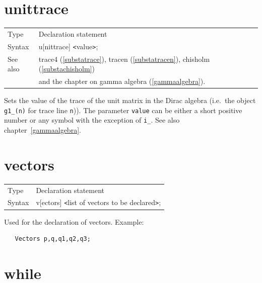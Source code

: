 
\section{unittrace}
\label{substaunittrace}

\noindent \begin{tabular}{ll}
Type & Declaration statement\\
Syntax & u[nittrace] {\tt<}value{\tt>}; \\
See also & trace4 (\ref{substatrace}), tracen (\ref{substatracen}),
    chisholm (\ref{substachisholm}) \\ &
    and the chapter on gamma algebra (\ref{gammaalgebra}).
\end{tabular} \vspace{4mm}

\noindent Sets the value of the trace of the 
unit matrix in the Dirac 
algebra (i.e.\ the object \verb:g1_(n): for trace line 
\verb:n:)). The parameter \verb:value: can be either a short positive 
number or any symbol with the exception of \verb:i_:. See also 
chapter~\ref{gammaalgebra}. \vspace{10mm}


\section{vectors}
\label{substavectors}

\noindent \begin{tabular}{ll}
Type & Declaration statement\\
Syntax & v[ectors] {\tt<}list of vectors to be declared{\tt>};
\end{tabular} \vspace{4mm}

\noindent Used for the declaration of vectors. Example:
\begin{verbatim}
   Vectors p,q,q1,q2,q3;
\end{verbatim}
\vspace{10mm}


\section{while}
\label{substawhile}

